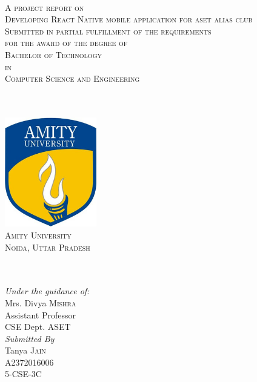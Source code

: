 \begin{titlepage}
  
  \begin{center}
    
    \begin{minipage}{1\textwidth}
      \begin{center}
        \textsc{ }\\[1.5cm]
        \textsc{\Large A project report on} \\ [1.0cm]
        \textsc{\huge Developing React Native mobile application for aset alias club}\\[0.7cm]
        \textsc{\small Submitted in partial fulfillment of the requirements \\for the award of the degree of }\\[0.7cm]
        \textsc{\large Bachelor of Technology \\ in \\ Computer Science and Engineering}
      \end{center}
    \end{minipage}

    \textsc{}\\[0.3cm]
    \HRule \\[0.3cm]

    \includegraphics[width=40mm, height=48mm]{./title/Amity-Logo.jpg}\\
    \textsc{\Large Amity University \\ [0.1cm] Noida, Uttar Pradesh} 

    \textsc{}\\
    \HRule \\[0.3cm]


    \emph{Under the guidance of:}\\[0.3cm]
    Mrs. Divya \textsc{Mishra}\\ 
    Assistant Professor\\ CSE Dept. ASET
    \\[0.4cm]
    \emph{Submitted By}\\
    Tanya \textsc{Jain}\\
    A2372016006\\
    5-CSE-3C
  \end{center}
\end{titlepage}